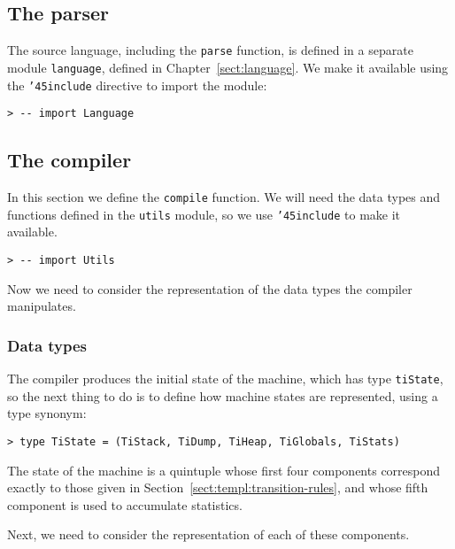 \subsection{The parser}

The source language, including the \mbox{\tt parse} function,
is defined in a separate module \mbox{\tt language}, defined
in Chapter~\ref{sect:language}.
We make it available using the
\mbox{\tt {\char'45}include} directive to import the module:
\begin{verbatim}
> -- import Language
\end{verbatim}
\subsection{The compiler}

In this section we define the \mbox{\tt compile} function.  We will need
the data types and functions defined in the \mbox{\tt utils} module, so we
use \mbox{\tt {\char'45}include} to make it available.
\begin{verbatim}
> -- import Utils
\end{verbatim}
Now we need to consider the representation of the data types the
compiler manipulates.

\subsubsection{Data types}

The compiler produces the initial state of the machine, which has
type \mbox{\tt tiState}, so the next thing to do is to define how machine states
are represented, using a type synonym:
\begin{verbatim}
> type TiState = (TiStack, TiDump, TiHeap, TiGlobals, TiStats)
\end{verbatim}
%
The state of the machine is a quintuple whose first four components correspond
exactly to those given in Section~\ref{sect:templ:transition-rules}, and whose
fifth component is used to accumulate statistics.

Next, we need to consider the representation of each of these components.

